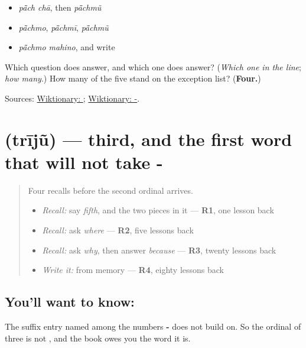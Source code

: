 \begin{itemize}
\raggedright
  \item \emph{pā̃ch chā}, then \emph{pā̃chmũ}
  \item \emph{pā̃chmo}, \emph{pā̃chmī}, \emph{pā̃chmũ}
  \item \emph{pā̃chmo mahino}, and write \textbf{}
\end{itemize}

\begin{tcolorbox}[breakable,colback=teal!4,colframe=teal!35!black,title={Before you move on}]
Which question does \textbf{} answer, and which one does \textbf{} answer? (\emph{Which one in the line}; \emph{how many}.) How many of the five stand on the exception list? (\textbf{Four.})

Sources: \href{https://en.wiktionary.org/wiki/\%E0\%AA\%AA\%E0\%AA\%BE\%E0\%AA\%82\%E0\%AA\%9A\%E0\%AA\%AE\%E0\%AB\%81\%E0\%AA\%82}{Wiktionary: }; \href{https://en.wiktionary.org/wiki/-\%E0\%AA\%AE\%E0\%AB\%81\%E0\%AA\%82}{Wiktionary: -}.
\end{tcolorbox}
\section[\texorpdfstring{\gu{ત્રીજું} (trījũ)}{ત્રીજું (trījũ)}]{ (trījũ) — third, and the first word that will not take -}

\label{lesson:GU-C38-triju}



\begin{quote}
Four recalls before the second ordinal arrives.

\begin{itemize}
\raggedright
  \item \emph{Recall:} say \emph{fifth}, and the two pieces in it — \textbf{R1}, one lesson back
  \item \emph{Recall:} ask \emph{where} — \textbf{R2}, five lessons back
  \item \emph{Recall:} ask \emph{why}, then answer \emph{because} — \textbf{R3}, twenty lessons back
  \item \emph{Write it:} \textbf{} from memory — \textbf{R4}, eighty lessons back
\end{itemize}
\end{quote}

\subsection*{You'll want to know: }
The suffix entry named \textbf{} among the numbers \textbf{-} does not build on. So the ordinal of three is not \textbf{}, and the book owes you the word it is.

